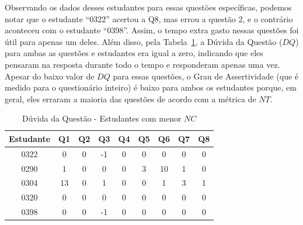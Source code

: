 Observando os dados desses estudantes para essas questões específicas, podemos notar que o estudante ``0322'' acertou a Q8, mas errou a questão 2, e o contrário aconteceu com o estudante ``0398''. Assim, o tempo extra gasto nessas questões foi útil para apenas um deles. Além disso, pela Tabela~\ref{tab:QD_3rdquadrant}, a Dúvida da Questão ($DQ$) para ambas as questões e estudantes era igual a zero, indicando que eles pensaram na resposta durante todo o tempo e responderam apenas uma vez. Apesar do baixo valor de $DQ$ para essas questões, o Grau de Assertividade (que é medido para o questionário inteiro) é baixo para ambos os estudantes porque, em geral, eles erraram a maioria das questões de acordo com a métrica de $NT$.

\begin{table}[htbp]
\caption{Dúvida da Questão - Estudantes com menor $NC$}
\centering
\begin{tabular}{|c|c|c|c|c|c|c|c|c|}
\hline
\textbf{Estudante} & \textbf{Q1} & \textbf{Q2} & \textbf{Q3} & \textbf{Q4} & \textbf{Q5} & \textbf{Q6} & \textbf{Q7} & \textbf{Q8} \\ \hline
0322 & 0 & 0 & -1 & 0 & 0 & 0 & 0 & 0 \\ \hline
0290 & 1 & 0 & 0 & 0 & 3 & 10 & 1 & 0 \\ \hline
0304 & 13 & 0 & 1 & 0 & 0 & 1 & 3 & 1 \\ \hline
0320 & 0 & 0 & 0 & 0 & 0 & 0 & 0 & 0 \\ \hline
0398 & 0 & 0 & -1 & 0 & 0 & 0 & 0 & 0 \\ \hline
\end{tabular}
\label{tab:QD_3rdquadrant}
\end{table}


